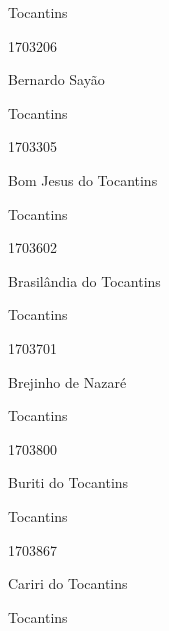 \documentclass[
  letterpaper,
]{report}
\begin{document}
\n    

\n      

Tocantins

\n      

1703206

\n      

Bernardo Sayão

\n    

\n    

\n      

Tocantins

\n      

1703305

\n      

Bom Jesus do Tocantins

\n    

\n    

\n      

Tocantins

\n      

1703602

\n      

Brasilândia do Tocantins

\n    

\n    

\n      

Tocantins

\n      

1703701

\n      

Brejinho de Nazaré

\n    

\n    

\n      

Tocantins

\n      

1703800

\n      

Buriti do Tocantins

\n    

\n    

\n      

Tocantins

\n      

1703867

\n      

Cariri do Tocantins

\n    

\n    

\n      

Tocantins

\n      
\end{document}
